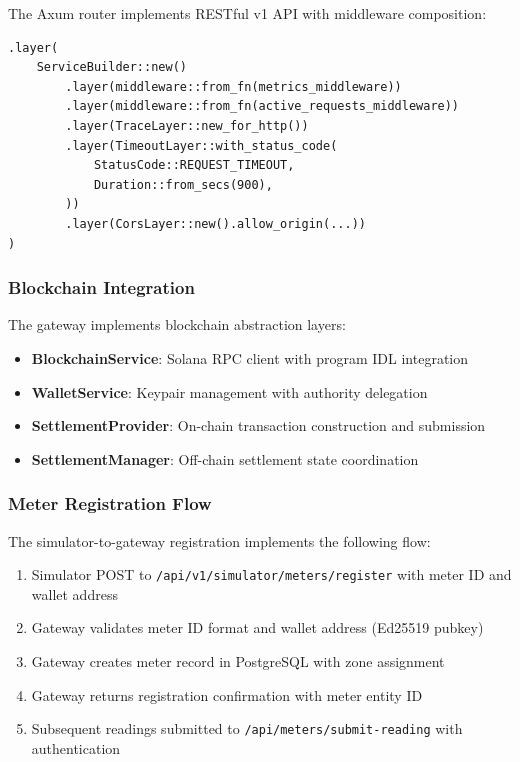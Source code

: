 \documentclass[conference]{IEEEtran}
\begin{document}
The Axum router implements RESTful v1 API with middleware composition:

\begin{lstlisting}[caption={Router Middleware Stack}]
.layer(
    ServiceBuilder::new()
        .layer(middleware::from_fn(metrics_middleware))
        .layer(middleware::from_fn(active_requests_middleware))
        .layer(TraceLayer::new_for_http())
        .layer(TimeoutLayer::with_status_code(
            StatusCode::REQUEST_TIMEOUT,
            Duration::from_secs(900),
        ))
        .layer(CorsLayer::new().allow_origin(...))
)
\end{lstlisting}

\subsubsection{Blockchain Integration}

The gateway implements blockchain abstraction layers:

\begin{itemize}
    \item \textbf{BlockchainService}: Solana RPC client with program IDL integration
    \item \textbf{WalletService}: Keypair management with authority delegation
    \item \textbf{SettlementProvider}: On-chain transaction construction and submission
    \item \textbf{SettlementManager}: Off-chain settlement state coordination
\end{itemize}

\subsubsection{Meter Registration Flow}

The simulator-to-gateway registration implements the following flow:

\begin{enumerate}
    \item Simulator POST to \texttt{/api/v1/simulator/meters/register} with meter ID and wallet address
    \item Gateway validates meter ID format and wallet address (Ed25519 pubkey)
    \item Gateway creates meter record in PostgreSQL with zone assignment
    \item Gateway returns registration confirmation with meter entity ID
    \item Subsequent readings submitted to \texttt{/api/meters/submit-reading} with authentication
\end{enumerate}
\end{document}

